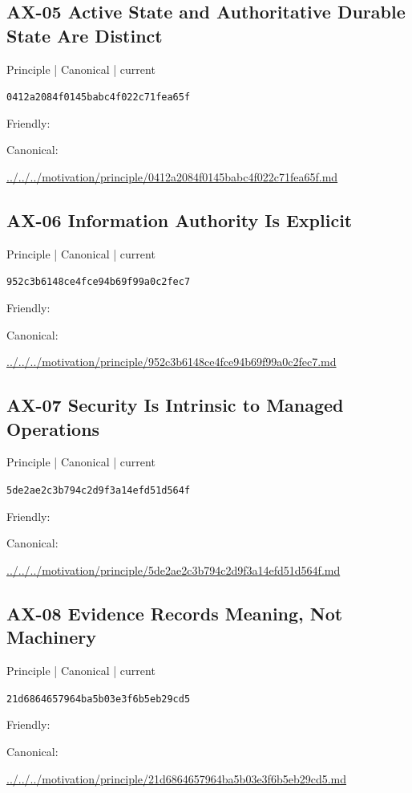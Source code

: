 \documentclass[10pt,a4paper]{article}
\begin{document}
\subsection*{AX-05 Active State and Authoritative Durable State Are Distinct}
{\small Principle | Canonical | current}\par
\texttt{0412a2084f0145babc4f022c71fea65f}\par
Friendly: \par
Canonical: \par
{\footnotesize\url{../../../motivation/principle/0412a2084f0145babc4f022c71fea65f.md}}\par
\subsection*{AX-06 Information Authority Is Explicit}
{\small Principle | Canonical | current}\par
\texttt{952c3b6148ce4fce94b69f99a0c2fec7}\par
Friendly: \par
Canonical: \par
{\footnotesize\url{../../../motivation/principle/952c3b6148ce4fce94b69f99a0c2fec7.md}}\par
\subsection*{AX-07 Security Is Intrinsic to Managed Operations}
{\small Principle | Canonical | current}\par
\texttt{5de2ae2c3b794c2d9f3a14efd51d564f}\par
Friendly: \par
Canonical: \par
{\footnotesize\url{../../../motivation/principle/5de2ae2c3b794c2d9f3a14efd51d564f.md}}\par
\subsection*{AX-08 Evidence Records Meaning, Not Machinery}
{\small Principle | Canonical | current}\par
\texttt{21d6864657964ba5b03e3f6b5eb29cd5}\par
Friendly: \par
Canonical: \par
{\footnotesize\url{../../../motivation/principle/21d6864657964ba5b03e3f6b5eb29cd5.md}}\par
\end{document}
